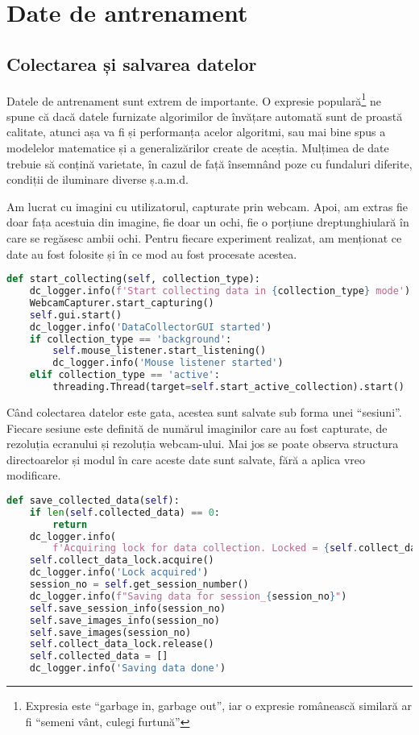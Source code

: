 \chapter{Date de antrenament}
\section{Colectarea și salvarea datelor}
Datele de antrenament sunt extrem de importante.
O expresie populară\footnote{Expresia este ``garbage in, garbage out'', iar o expresie românească similară ar fi ``semeni vânt, culegi furtună''} ne spune că dacă datele furnizate algorimilor de învățare automată sunt de proastă calitate, atunci așa va fi și performanța acelor algoritmi, sau mai bine spus a modelelor matematice și a generalizărilor create de aceștia.
Mulțimea de date trebuie să conțină varietate, în cazul de față însemnând poze cu fundaluri diferite, condiții de iluminare diverse ș.a.m.d.

Am lucrat cu imagini cu utilizatorul, capturate prin webcam.
Apoi, am extras fie doar fața acestuia din imagine, fie doar un ochi, fie o porțiune dreptunghiulară în care se regăsesc ambii ochi.
Pentru fiecare experiment realizat, am menționat ce date au fost folosite și în ce mod au fost procesate acestea.

\begin{lstlisting}[language=Python, caption=Colectarea datelor]
def start_collecting(self, collection_type):
    dc_logger.info(f'Start collecting data in {collection_type} mode')
    WebcamCapturer.start_capturing()
    self.gui.start()
    dc_logger.info('DataCollectorGUI started')
    if collection_type == 'background':
        self.mouse_listener.start_listening()
        dc_logger.info('Mouse listener started')
    elif collection_type == 'active':
        threading.Thread(target=self.start_active_collection).start()
\end{lstlisting}

Când colectarea datelor este gata, acestea sunt salvate sub forma unei ``sesiuni''.
Fiecare sesiune este definită de numărul imaginilor care au fost capturate, de rezoluția ecranului și rezoluția webcam-ului.
Mai jos se poate observa structura directoarelor și modul în care aceste date sunt salvate, fără a aplica vreo modificare.

\begin{lstlisting}[language=Python, caption=Salvarea datelor]
def save_collected_data(self):
    if len(self.collected_data) == 0:
        return
    dc_logger.info(
        f'Acquiring lock for data collection. Locked = {self.collect_data_lock.locked()}')
    self.collect_data_lock.acquire()
    dc_logger.info('Lock acquired')
    session_no = self.get_session_number()
    dc_logger.info(f"Saving data for session_{session_no}")
    self.save_session_info(session_no)
    self.save_images_info(session_no)
    self.save_images(session_no)
    self.collect_data_lock.release()
    self.collected_data = []
    dc_logger.info('Saving data done')
\end{lstlisting}


